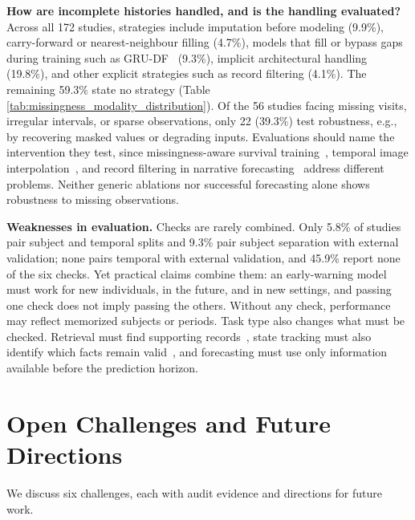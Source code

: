\documentclass[11pt]{article}
\theoremstyle{plain}
\theoremstyle{definition}
\theoremstyle{remark}
\begin{document}
\noindent\textbf{How are incomplete histories handled, and is the handling evaluated?} Across all 172 studies, strategies include imputation before modeling (9.9\%), carry-forward or nearest-neighbour filling (4.7\%), models that fill or bypass gaps during training such as GRU-DF~\citep{9374359} (9.3\%), implicit architectural handling (19.8\%), and other explicit strategies such as record filtering (4.1\%). The remaining 59.3\% state no strategy (Table \ref{tab:missingness_modality_distribution}). Of the 56 studies facing missing visits, irregular intervals, or sparse observations, only 22 (39.3\%) test robustness, e.g., by recovering masked values or degrading inputs. Evaluations should name the intervention they test, since missingness-aware survival training~\citep{11373479}, temporal image interpolation~\citep{11437527}, and record filtering in narrative forecasting~\citep{hayat-etal-2025-context} address different problems. Neither generic ablations nor successful forecasting alone shows robustness to missing observations.

\noindent\textbf{Weaknesses in evaluation.} Checks are rarely combined. Only 5.8\% of studies pair subject and temporal splits and 9.3\% pair subject separation with external validation; none pairs temporal with external validation, and 45.9\% report none of the six checks. Yet practical claims combine them: an early-warning model must work for new individuals, in the future, and in new settings, and passing one check does not imply passing the others. Without any check, performance may reflect memorized subjects or periods. Task type also changes what must be checked. Retrieval must find supporting records~\citep{agarwal-etal-2026-deterministic}, state tracking must also identify which facts remain valid~\citep{zhao-etal-2026-beyond-retrieval}, and forecasting must use only information available before the prediction horizon.%




\section{Open Challenges and Future Directions}
\label{sec:open_challenges}
\label{sec:discussion_future}
We discuss six challenges, each with audit evidence and directions for future work.
\end{document}
